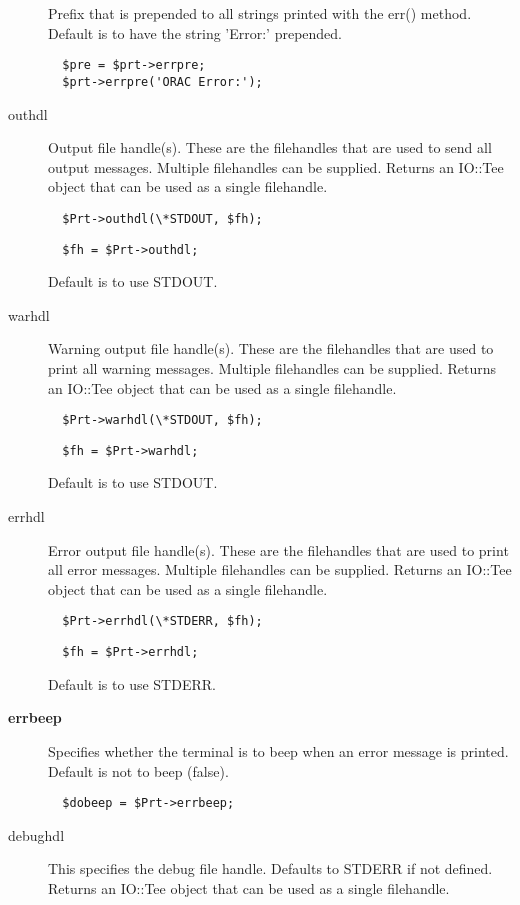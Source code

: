 \begin{description}
Prefix that is prepended to all strings printed with the
err() method. Default is to have the string 'Error:' prepended.

\begin{verbatim}
  $pre = $prt->errpre;
  $prt->errpre('ORAC Error:');
\end{verbatim}

\item[{outhdl}] \mbox{}

Output file handle(s). These are the filehandles that are used
to send all output messages. Multiple filehandles can be supplied.
Returns an IO::Tee object that can be used as a single filehandle.

\begin{verbatim}
  $Prt->outhdl(\*STDOUT, $fh);
\end{verbatim}
\begin{verbatim}
  $fh = $Prt->outhdl;
\end{verbatim}


Default is to use STDOUT.


\item[{warhdl}] \mbox{}

Warning output file handle(s). These are the filehandles that are used
to print all warning messages. Multiple filehandles can be supplied.
Returns an IO::Tee object that can be used as a single filehandle.

\begin{verbatim}
  $Prt->warhdl(\*STDOUT, $fh);
\end{verbatim}
\begin{verbatim}
  $fh = $Prt->warhdl;
\end{verbatim}


Default is to use STDOUT.


\item[{errhdl}] \mbox{}

Error output file handle(s). These are the filehandles that are used
to print all error messages. Multiple filehandles can be supplied.
Returns an IO::Tee object that can be used as a single filehandle.

\begin{verbatim}
  $Prt->errhdl(\*STDERR, $fh);
\end{verbatim}
\begin{verbatim}
  $fh = $Prt->errhdl;
\end{verbatim}


Default is to use STDERR.


\item[{\textbf{errbeep}}] \mbox{}

Specifies whether the terminal is to beep when an error
message is printed. Default is not to beep (false).

\begin{verbatim}
  $dobeep = $Prt->errbeep;
\end{verbatim}

\item[{debughdl}] \mbox{}

This specifies the debug file handle. Defaults to STDERR if not
defined. Returns an IO::Tee object that can be used as a single
filehandle.

\end{description}
